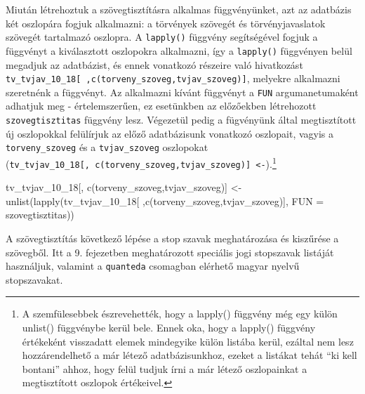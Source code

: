 \documentclass[
]{book}
\newenvironment{Shaded}{\begin{snugshade}}{\end{snugshade}}
\newcommand{\AttributeTok}[1]{\textcolor[rgb]{0.77,0.63,0.00}{#1}}
\newcommand{\FunctionTok}[1]{\textcolor[rgb]{0.00,0.00,0.00}{#1}}
\newcommand{\NormalTok}[1]{#1}
\newcommand{\OtherTok}[1]{\textcolor[rgb]{0.56,0.35,0.01}{#1}}
\newcommand{\StringTok}[1]{\textcolor[rgb]{0.31,0.60,0.02}{#1}}
\begin{document}
Miután létrehoztuk a szövegtisztításra alkalmas függvényünket, azt az
adatbázis két oszlopára fogjuk alkalmazni: a törvények szövegét és
törvényjavaslatok szövegét tartalmazó oszlopra. A \texttt{lapply()}
függvény segítségével fogjuk a függvényt a kiválasztott oszlopokra
alkalmazni, így a \texttt{lapply()} függvényen belül megadjuk az
adatbázist, és ennek vonatkozó részeire való hivatkozást
\texttt{tv\_tvjav\_10\_18{[}\ ,c(\textquotesingle{}torveny\_szoveg\textquotesingle{},\textquotesingle{}tvjav\_szoveg\textquotesingle{}){]}},
melyekre alkalmazni szeretnénk a függvényt. Az alkalmazni kívánt
függvényt a \texttt{FUN} argumanetumaként adhatjuk meg - értelemszerűen,
ez esetünkben az előzőekben létrehozott \texttt{szovegtisztitas}
függvény lesz. Végezetül pedig a fügvényünk által megtisztított új
oszlopokkal felülírjuk az előző adatbázisunk vonatkozó oszlopait, vagyis
a \texttt{torveny\_szoveg} és a \texttt{tvjav\_szoveg} oszlopokat
(\texttt{tv\_tvjav\_10\_18{[},\ c(\textquotesingle{}torveny\_szoveg\textquotesingle{},\textquotesingle{}tvjav\_szoveg\textquotesingle{}){]}\ \textless{}-}).\footnote{A
  szemfülesebbek észrevehették, hogy a lapply() függvény még egy külön
  unlist() függvénybe kerül bele. Ennek oka, hogy a lapply() függvény
  értékeként visszadatt elemek mindegyike külön listába kerül, ezáltal
  nem lesz hozzárendelhető a már létező adatbázisunkhoz, ezeket a
  listákat tehát ``ki kell bontani'' ahhoz, hogy felül tudjuk írni a már
  létező oszlopainkat a megtisztított oszlopok értékeivel.}

\begin{Shaded}
\begin{Highlighting}[]
\NormalTok{tv\_tvjav\_10\_18[, }\FunctionTok{c}\NormalTok{(}\StringTok{\textquotesingle{}torveny\_szoveg\textquotesingle{}}\NormalTok{,}\StringTok{\textquotesingle{}tvjav\_szoveg\textquotesingle{}}\NormalTok{)] }\OtherTok{\textless{}{-}} \FunctionTok{unlist}\NormalTok{(}\FunctionTok{lapply}\NormalTok{(tv\_tvjav\_10\_18[ ,}\FunctionTok{c}\NormalTok{(}\StringTok{\textquotesingle{}torveny\_szoveg\textquotesingle{}}\NormalTok{,}\StringTok{\textquotesingle{}tvjav\_szoveg\textquotesingle{}}\NormalTok{)], }\AttributeTok{FUN =}\NormalTok{ szovegtisztitas))}
\end{Highlighting}
\end{Shaded}

A szövegtisztítás következő lépése a stop szavak meghatározása és
kiszűrése a szövegből. Itt a 9. fejezetben meghatározott speciális jogi
stopszavak listáját használjuk, valamint a \texttt{quanteda} csomagban
elérhető magyar nyelvű stopszavakat.
\end{document}

